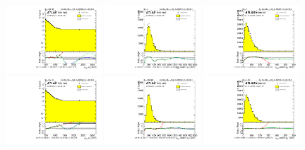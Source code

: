 \begin{figure}[htbp!]
\begin{center}
\includegraphics[width=0.32\textwidth,angle=-90]{figures/boosted/Reweight/Fits/Moriond_NoTag_2Trk_split_subl_Incl_leadHCand_Pt_m_1.pdf}
\includegraphics[width=0.32\textwidth,angle=-90]{figures/boosted/Reweight/Fits/Moriond_NoTag_2Trk_split_subl_Incl_leadHCand_trk0_Pt.pdf}
\includegraphics[width=0.32\textwidth,angle=-90]{figures/boosted/Reweight/Fits/Moriond_NoTag_2Trk_split_subl_Incl_leadHCand_trk1_Pt.pdf} \\
\includegraphics[width=0.32\textwidth,angle=-90]{figures/boosted/Reweight/Fits/Moriond_bkg_0_NoTag_2Trk_split_subl_Incl_leadHCand_Pt_m_1.pdf}
\includegraphics[width=0.32\textwidth,angle=-90]{figures/boosted/Reweight/Fits/Moriond_bkg_0_NoTag_2Trk_split_subl_Incl_leadHCand_trk0_Pt.pdf}
\includegraphics[width=0.32\textwidth,angle=-90]{figures/boosted/Reweight/Fits/Moriond_bkg_0_NoTag_2Trk_split_subl_Incl_leadHCand_trk1_Pt.pdf} \\

\end{center}
\end{figure}
